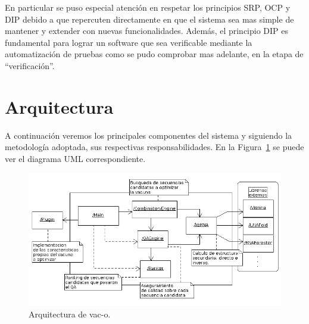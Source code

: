 En particular se puso especial atenci\'on en respetar los principios \ac{SRP}, 
\ac{OCP} y \ac{DIP} debido a que repercuten directamente en que el sistema sea
mas simple de mantener y extender con nuevas funcionalidades. Adem\'as, el
principio \ac{DIP} es fundamental para lograr un software que sea verificable
mediante la automatizaci\'on de pruebas como se pudo comprobar mas adelante, en
la etapa de ``verificaci\'on''.

\section{Arquitectura}

A continuaci\'on veremos los principales componentes del sistema y siguiendo la
metodolog\'ia adoptada, sus respectivas responsabilidades. En la
Figura~\ref{arquitectura} se puede ver el diagrama UML correspondiente. 

\begin{figure} 
  \centering
  \includegraphics[scale=0.5]{architecture.png}
  \caption{Arquitectura de vac-o.}
\label{arquitectura}
\end{figure}

